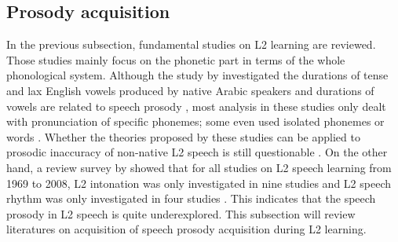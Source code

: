 \subsection{Prosody acquisition}

In the previous subsection, fundamental studies on L2 learning are reviewed. Those studies mainly focus on the phonetic part in terms of the whole phonological system. Although the study by \cite{munro1993productions} investigated the durations of tense and lax English vowels produced by native Arabic speakers and durations of vowels are related to speech prosody \citep{ramus1999correlates}, most analysis in these studies only dealt with pronunciation of specific phonemes; some even used isolated phonemes or words \citep{flege1987production}. Whether the theories proposed by these studies can be applied to prosodic inaccuracy of non-native L2 speech is still questionable \citep{rasier2007prosodic}. On the other hand, a review survey by \cite{gut2009non} showed that for all studies on L2 speech learning from 1969 to 2008, L2 intonation was only investigated in nine studies and L2 speech rhythm was only investigated in four studies \citep{mennen2004bi,altmann2006perception,rasier2007prosodic,lin2008interlanguage}. This indicates that the speech prosody in L2 speech is quite underexplored. This subsection will review literatures on acquisition of speech prosody acquisition during L2 learning.

